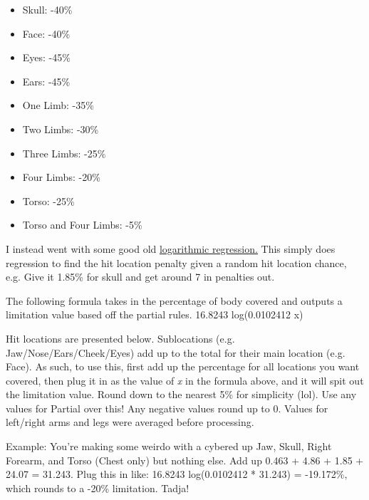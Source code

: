 \begin{multicols*}{2}
	\begin{itemize}
		\itemsep0em 
		\item Skull: -40\%
		\item Face: -40\%
		\item Eyes: -45\%
		\item Ears: -45\%
		\item One Limb: -35\%
		\item Two Limbs: -30\%
		\item Three Limbs: -25\%
		\item Four Limbs: -20\%
		\item Torso: -25\%
		\item Torso and Four Limbs: -5\%
	\end{itemize}
	
	\label{partial}
	
	I instead went with some good old \href{https://www.wolframalpha.com/input?i=logarithmic+regression&assumption=%7B%22C%22%2C+%22logarithmic+regression%22%7D+-%3E+%7B%22Calculator%22%7D&assumption=%7B%22F%22%2C+%22LogFitCalculator%22%2C+%22data2%22%7D+-%3E%22%7B%7B0.463%2C9%7D%2C%7B1.85%2C7%7D%2C%7B2.78%2C5%7D%2C%7B11.57%2C4%7D%2C%7B9.72%2C4%7D%2C%7B11.57%2C4%7D%2C%7B16.66%2C4%7D%2C%7B36.57%2C1%7D%2C%7B21.29%2C2%7D%2C%7B28.23%2C2%7D%7D%22}{logarithmic regression.} This simply does regression to find the hit location penalty given a random hit location chance, e.g. Give it 1.85\% for skull and get around 7 in penalties out.
	
	The following formula takes in the percentage of body covered and outputs a limitation value based off the partial rules.
	16.8243 log(0.0102412 x)
	
	Hit locations are presented below. Sublocations (e.g. Jaw/Nose/Ears/Cheek/Eyes) add up to the total for their main location (e.g. Face). As such, to use this, first add up the percentage for all locations you want covered, then plug it in as the value of \textit{x} in the formula above, and it will spit out the limitation value. Round down to the nearest 5\% for simplicity (lol). Use any values for Partial over this! Any negative values round up to 0. Values for left/right arms and legs were averaged before processing.
	
	Example: You're making some weirdo with a cybered up Jaw, Skull, Right Forearm, and Torso (Chest only) but nothing else. Add up 0.463 + 4.86 + 1.85 + 24.07 = 31.243. Plug this in like: 16.8243 log(0.0102412 * 31.243) = -19.172\%, which rounds to a -20\% limitation. Tadja!
	

\end{multicols*}
